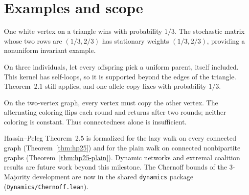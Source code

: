 \section{Examples and scope}
\begin{lemma}\label{lem:examples}
\leanok{}
One white vertex on a triangle wins with probability $1/3$.
The stochastic matrix whose two rows are $(1/3,2/3)$ has stationary
weights $(1/3,2/3)$, providing a nonuniform invariant example.
\end{lemma}
\begin{lemma}\label{lem:wf}
\leanok{}
On three individuals, let every offspring pick a uniform parent, itself included.
This kernel has self-loops, so it is supported beyond the edges of the triangle.
Theorem~2.1 still applies, and one allele copy fixes with probability $1/3$.
\end{lemma}
\begin{lemma}\label{lem:cycle}
\leanok{}
On the two-vertex graph, every vertex must copy the other vertex.
The alternating coloring flips each round and returns after two rounds;
neither coloring is constant. Thus connectedness alone is insufficient.
\end{lemma}
Hassin--Peleg Theorem~2.5 is formalized for the lazy walk on every connected graph
(Theorem~\ref{thm:hp25}) and for the plain walk on connected nonbipartite graphs
(Theorem~\ref{thm:hp25-plain}). Dynamic networks and extremal coalition results are future work
beyond this milestone. The Chernoff bounds of the 3-Majority development are now in the shared
\texttt{dynamics} package (\texttt{Dynamics/Chernoff.lean}).
